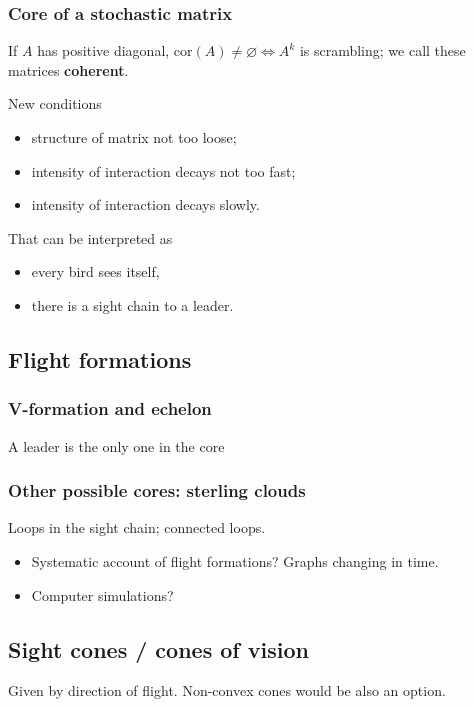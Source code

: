 \documentclass[11pt]{article}
\begin{document}
\subsubsection*{Core of a stochastic matrix}
\label{sec-15-3-1}
If $A$ has positive diagonal, $\mathrm{cor}(A) \neq \varnothing \iff A^k$ is scrambling;
we call these matrices \textbf{coherent}.

New conditions

\begin{itemize}
\item structure of matrix not too loose;
\item intensity of interaction decays not too fast;
\item intensity of interaction decays slowly.
\end{itemize}

That can be interpreted as

\begin{itemize}
\item every bird sees itself,
\item there is a sight chain to a leader.
\end{itemize}

\subsection*{Flight formations}
\label{sec-15-4}
\subsubsection*{V-formation and echelon}
\label{sec-15-4-1}
A leader is the only one in the core
\subsubsection*{Other possible cores: sterling clouds}
\label{sec-15-4-2}
Loops in the sight chain; connected loops.

\begin{itemize}
\item Systematic account of flight formations?
\label{sec-15-4-2-1}
Graphs changing in time.

\item Computer simulations?
\label{sec-15-4-2-2}
\end{itemize}

\subsection*{Sight cones / cones of vision}
\label{sec-15-5}
Given by direction of flight. Non-convex cones would be also an
option.
\end{document}
